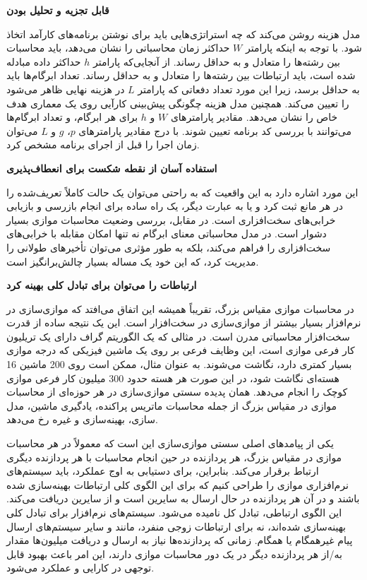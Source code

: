 \textbf{قابل تجزیه و تحلیل بودن}

مدل هزینه  روشن می‌کند که چه استراتژی‌هایی باید برای نوشتن برنامه‌های  کارآمد اتخاذ شود. با توجه به اینکه پارامتر $W$ حداکثر زمان محاسباتی را نشان می‌دهد، باید محاسبات بین رشته‌ها را متعادل و به حداقل رساند. از آنجایی‌که پارامتر $h$ حداکثر داده مبادله شده است، باید ارتباطات بین رشته‌ها را متعادل و به حداقل رساند. تعداد ابرگام‌ها باید به حداقل برسد، زیرا این مورد تعداد دفعاتی که پارامتر $L$ در هزینه نهایی ظاهر می‌شود را تعیین می‌کند. همچنین مدل هزینه چگونگی پیش‌بینی کارآیی روی یک معماری هدف خاص را نشان می‌دهد. مقادیر پارامترهای $W$ و $h$ برای هر ابرگام، و تعداد ابرگام‌ها می‌توانند با بررسی کد برنامه تعیین شوند. با درج مقادیر پارامترهای $p$، $g$ و $L$ می‌توان زمان اجرا را قبل از اجرای برنامه مشخص کرد. 

\textbf{استفاده آسان از نقطه شکست برای انعطاف‌پذیری}

این مورد اشاره دارد به این واقعیت که به راحتی می‌توان یک حالت کاملاً تعریف‌شده را در هر مانع ثبت کرد و یا به عبارت دیگر، یک راه ساده برای انجام بازرسی و بازیابی خرابی‌های سخت‌افزاری است. در مقابل، بررسی وضعیت محاسبات موازی بسیار دشوار است. در مدل محاسباتی  معنای ابرگام نه تنها امکان مقابله با خرابی‌های سخت‌افزاری را فراهم می‌کند، بلکه به طور مؤثری می‌توان تأخیرهای طولانی را مدیریت کرد، که این خود یک مساله بسیار چالش‌برانگیز است.

\textbf{ارتباطات را می‌توان برای تبادل کلی بهینه کرد}

در محاسبات موازی مقیاس بزرگ، تقریباً همیشه این اتفاق می‌افتد که موازی‌سازی در نرم‌افزار بسیار بیشتر از موازی‌سازی در سخت‌افزار است. این یک نتیجه ساده از قدرت سخت‌افزار محاسباتی مدرن است. در مثالی که یک الگوریتم گراف دارای یک تریلیون کار فرعی موازی است، این وظایف فرعی بر روی یک ماشین فیزیکی که درجه موازی بسیار کمتری دارد، نگاشت می‌شوند. به عنوان مثال، ممکن است روی 200 ماشین 16 هسته‌ای نگاشت شود، در این صورت هر هسته حدود 300 میلیون کار فرعی موازی کوچک را انجام می‌دهد. همان پدیده سستی موازی‌سازی در هر حوزه‌ای از محاسبات موازی در مقیاس بزرگ از جمله محاسبات ماتریس پراکنده، یادگیری ماشین، مدل سازی، بهینه‌سازی و غیره رخ می‌دهد. 

یکی از پیامدهای اصلی سستی موازی‌سازی این است که معمولاً در هر محاسبات موازی در مقیاس بزرگ، هر پردازنده در حین انجام محاسبات با هر پردازنده دیگری ارتباط برقرار می‌کند. بنابراین، برای دستیابی به اوج عملکرد، باید سیستم‌های نرم‌افزاری موازی را طراحی کنیم که برای این الگوی کلی ارتباطات بهینه‌سازی شده باشند و در آن هر پردازنده در حال ارسال به سایرین است و از سایرین دریافت می‌کند. این الگوی ارتباطی، تبادل کل نامیده می‌شود. سیستم‌های نرم‌افزار  برای تبادل کلی بهینه‌سازی شده‌اند، نه برای ارتباطات زوجی منفرد، مانند  و سایر سیستم‌های ارسال پیام غیرهمگام یا همگام. زمانی که پردازنده‌ها نیاز به ارسال و دریافت میلیون‌ها مقدار به/از هر پردازنده دیگر در یک دور محاسبات موازی دارند، این امر باعث بهبود قابل توجهی در کارایی و عملکرد می‌شود.

